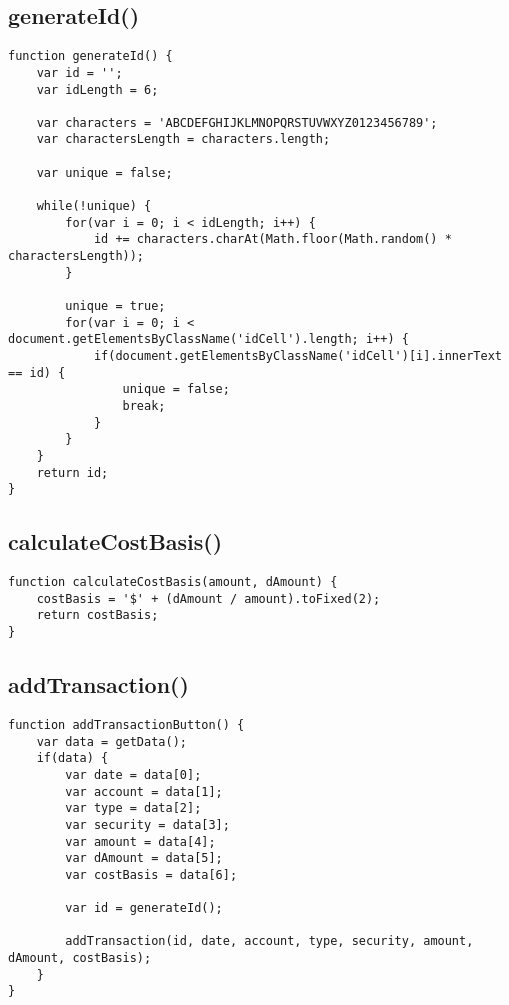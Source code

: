 \documentclass[letterpaper]{article}
\begin{document}
\subsection{generateId()}

\begin{lstlisting}[firstnumber=109]
function generateId() {
    var id = '';
    var idLength = 6;

    var characters = 'ABCDEFGHIJKLMNOPQRSTUVWXYZ0123456789';
    var charactersLength = characters.length;

    var unique = false;

    while(!unique) {
        for(var i = 0; i < idLength; i++) {
            id += characters.charAt(Math.floor(Math.random() * charactersLength));
        }

        unique = true;
        for(var i = 0; i < document.getElementsByClassName('idCell').length; i++) {
            if(document.getElementsByClassName('idCell')[i].innerText == id) {
                unique = false;
                break;
            }
        }
    }
    return id;
}
\end{lstlisting}

\subsection{calculateCostBasis()}

\begin{lstlisting}[firstnumber=134]
function calculateCostBasis(amount, dAmount) {
    costBasis = '$' + (dAmount / amount).toFixed(2);
    return costBasis;
}
\end{lstlisting}

\subsection{addTransaction()}

\begin{lstlisting}[firstnumber=156]
function addTransactionButton() {
    var data = getData();
    if(data) {
        var date = data[0];
        var account = data[1];
        var type = data[2];
        var security = data[3];
        var amount = data[4];
        var dAmount = data[5];
        var costBasis = data[6];

        var id = generateId();

        addTransaction(id, date, account, type, security, amount, dAmount, costBasis);
    }
}
\end{lstlisting}
\end{document}
